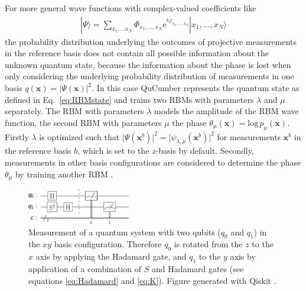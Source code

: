 \documentclass[pra,aps,showpacs,groupedaddress,superscriptaddress,twocolumn,toc=flat,biblatex,footinbib]{revtex4-1}
\newcommand{\ket}[1]{|#1\rangle}
\renewcommand{\vec}[1]{\bm{#1}}
\begin{document}
For more general wave functions with complex-valued coefficients like
\begin{align}
\ket{\Psi} = \sum_{x_1, \dots x_N} \Phi_{x_1, \dots, x_N} \mathrm{e}^{i\varphi_{x_1, \dots, x_N}}\ket{x_1, \dots, x_N}
\label{eq:complex_psi}
\end{align}
the probability distribution underlying the outcomes of projective
measurements in the reference basis does not contain all possible information about the unknown quantum state, because the information about the phase is lost when only considering the underlying probability distribution of measurements in one basis $q(\vec{x})=\vert \Psi (\vec{x})\vert^2$. In this case QuCumber represents the quantum state as defined in Eq.~\eqref{eq:RBMstate}
and trains two RBMs with parameters $\lambda$ and $\mu$ separately. The RBM with parameters $\lambda$ models the amplitude of the RBM wave function, the second RBM with parameters $\mu$ the phase $\theta_\mu(\vec{x}) = \mathrm{log}\, p_\mu(\vec{x})$. Firstly $\lambda$ is optimized such that $\vert \Psi (\vec{x}^b)\vert ^2 = \vert \psi_{\lambda, \mu} (\vec{x}^b)\vert ^2 $ for measurements $\vec{x}^b$ in the reference basis $b$, which is set to the $z$-basis by default. Secondly, measurements in other basis configurations are considered to determine the phase $\theta_\mu$ by training another RBM \cite{Torlai2018}.\\

\begin{figure}[t!]
	\centering
  \includegraphics[width=0.4\textwidth]{Fig11.pdf}
	\caption[Measurement of a quantum circuit in the $xy$ basis configuration]{Measurement of a quantum system with two qubits ($q_0$ and $q_1$) in the $xy$ basis configuration. Therefore $q_0$ is rotated from the $z$ to the $x$ axis by applying the Hadamard gate, and $q_1$ to the $y$ axis by application of a combination of $S$ and Hadamard gates (see equations \eqref{eq:Hadamard} and \eqref{eq:K}). Figure generated with Qiskit \cite{Qiskit2010}.}
	\label{fig:Configs}
\end{figure}
\end{document}
